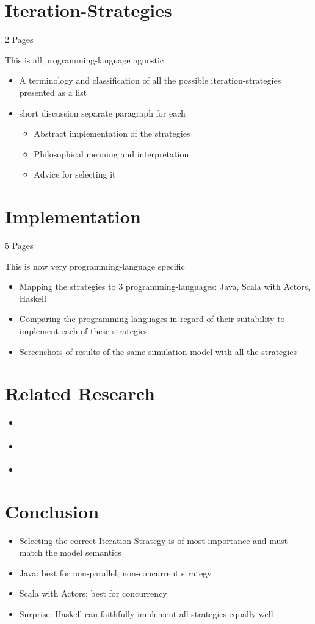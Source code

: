 \section{Iteration-Strategies}
2 Pages

This is all programming-language agnostic

\begin{itemize}
	\item A terminology and classification of all the possible iteration-strategies presented as a list 
	\item short discussion separate paragraph for each
		\begin{itemize}
			\item Abstract implementation of the strategies
			\item Philosophical meaning and interpretation
			\item Advice for selecting it
		\end{itemize}
\end{itemize}

\section{Implementation}
5 Pages

This is now very programming-language specific

\begin{itemize}
	\item Mapping the strategies to 3 programming-languages: Java, Scala with Actors, Haskell
	\item Comparing the programming languages in regard of their suitability to implement each of these strategies
	\item Screenshots of results of the same simulation-model with all the strategies
\end{itemize}


\section{Related Research}
\begin{itemize}
	\item \cite{huberman_evolutionary_1993}
	\item \cite{a_framework_2008}
	\item \cite{botta_time_2010}
\end{itemize}

\section{Conclusion}
\begin{itemize}
	\item Selecting the correct Iteration-Strategy is of most importance and must match the model semantics
	\item Java: best for non-parallel, non-concurrent strategy
	\item Scala with Actors: best for concurrency
	\item Surprise: Haskell can faithfully implement all strategies equally well
\end{itemize}

